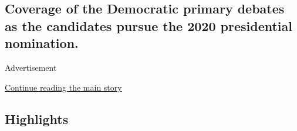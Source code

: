 \hypertarget{coverage-of-the-democratic-primary-debates-as-the-candidates-pursue-the-2020-presidential-nomination-1}{%
\subsection{Coverage of the Democratic primary debates as the candidates
pursue the 2020 presidential
nomination.}\label{coverage-of-the-democratic-primary-debates-as-the-candidates-pursue-the-2020-presidential-nomination-1}}

Advertisement

\protect\hyperlink{after-subheader}{Continue reading the main story}

\hypertarget{highlights}{%
\subsection{Highlights}\label{highlights}}

